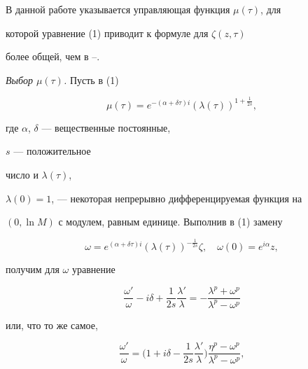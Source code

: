  


В данной работе указывается управляющая функция $\mu(\tau)$, для 


которой уравнение (1) приводит к формуле для $\zeta(z,\tau)$


более общей, чем в \cite{2}--\cite{4}. 


\medskip 


 


{\it Выбор $\mu(\tau)$.} Пусть в (1) 


\begin{equation} 


\mu(\tau)=e^{-(\alpha+\delta\tau)i} 


(\lambda(\tau))^{1+\frac{1}{2s}}, 


\end{equation} 


где $\alpha$, $\delta$ --- вещественные постоянные, 


$s$ --- положительное 


число и $\lambda(\tau)$, 


$\lambda(0)=1$, --- некоторая непрерывно дифференцируемая функция на 


$(0,\ln M)$ с модулем, равным единице. Выполнив в (1) замену 


\begin{equation} 


\omega=e^{(\alpha+\delta\tau)i}(\lambda(\tau))^{-\frac{1}{2s}}\zeta, 


\quad \omega(0)=e^{i\alpha}z, 


\end{equation} 


получим для $\omega$ уравнение 


$$ 


\frac{\omega'}{\omega}-i\delta+\frac{1}{2s}\frac{\lambda'}{\lambda}= 


-\frac{\lambda^p+\omega^p}{\lambda^p-\omega^p} 


$$ 


или, что то же самое, 


\begin{equation} 


\frac{\omega'}{\omega}=\bigg(1+i\delta-\frac{1}{2s} 


\frac{\lambda'}{\lambda}\bigg) 


\frac{\eta^p-\omega^p}{\lambda^p-\omega^p}, 


\end{equation} 


